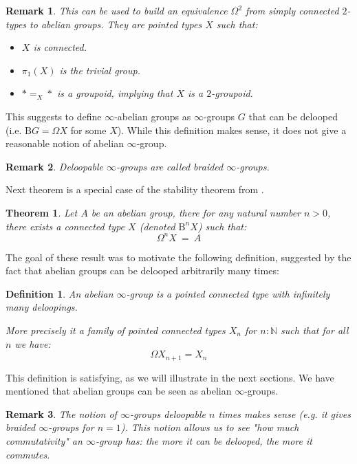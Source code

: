 \documentclass{article}
\newcommand{\B}{\mathrm{B}}
\newtheorem{definition}{Definition}
\newtheorem{theorem}{Theorem}
\newtheorem{remark}{Remark}
\begin{document}
\begin{remark}
This can be used to build an equivalence $\Omega^2$ from simply connected $2$-types to abelian groups. They are pointed types $X$ such that:
\begin{itemize}
\item $X$ is connected.
\item $\pi_1(X)$ is the trivial group.
\item $*=_X*$ is a groupoid, implying that $X$ is a $2$-groupoid.
\end{itemize}
\end{remark}

This suggests to define $\infty$-abelian groups as $\infty$-groups $G$ that can be delooped (i.e. $\B G = \Omega X$ for some $X$). While this definition makes sense, it does not give a reasonable notion of abelian $\infty$-group.

\begin{remark}
Deloopable $\infty$-groups are called \emph{braided $\infty$-groups}.
\end{remark}

 Next theorem is a special case of the stability theorem from \cite{buchholtz2018higher}.

\begin{theorem}
Let $A$ be an abelian group, there for any natural number $n>0$, there exists a connected type $X$ (denoted $\B^nX$) such that:
\[\Omega^n X \ = \ A\]
\end{theorem}

The goal of these result was to motivate the following definition, suggested by the fact that abelian groups can be delooped arbitrarily many times:

\begin{definition}
An abelian $\infty$-group is a pointed connected type with infinitely many deloopings. 

More precisely it a family of pointed connected types $X_n$ for $n:\mathbb{N}$ such that for all $n$ we have:
\[\Omega X_{n+1} = X_n\]
\end{definition}

This definition is satisfying, as we will illustrate in the next sections. We have mentioned that abelian groups can be seen as abelian $\infty$-groups.

\begin{remark}
The notion of $\infty$-groups deloopable $n$ times makes sense (e.g. it gives braided $\infty$-groups for $n=1$). This notion allows us to see "how much commutativity" an $\infty$-group has: the more it can be delooped, the more it commutes.
\end{remark}
\end{document}
